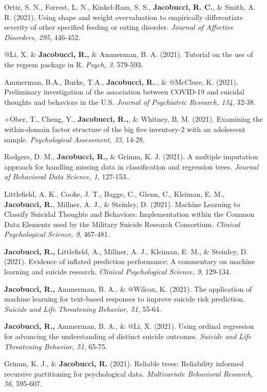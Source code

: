 \documentclass[letterpaper,10pt]{article}
\begin{document}
\begin{etaremune}
	\item Ortiz, S. N., Forrest, L. N., Kinkel-Ram, S. S., \textbf{Jacobucci, R. C.}, \& Smith, A. R. (2021). Using shape and weight overvaluation to empirically differentiate severity of other specified feeding or eating disorder. \emph{Journal of Affective Disorders, 295}, 446-452.
	\item $@$Li, X. \& \textbf{Jacobucci, R.,} \& Ammerman, B. A. (2021). Tutorial on the use of the regsem package in R. \emph{Psych, 3}. 579-593.
		\item Ammerman, B.A., Burke, T.A., \textbf{Jacobucci, R.}., \& $@$McClure, K. (2021). Preliminary investigation of the association between COVID-19 and suicidal thoughts and behaviors in the U.S. \emph{Journal of Psychiatric Research, 134}, 32-38.
	\item $+$Ober, T., Cheng, Y., \textbf{Jacobucci, R.,}, \& Whitney, B, M. (2021). Examining the within-domain factor structure of the big five inventory-2 with an adolescent sample. \emph{Psychological Assessment, 33}, 14-28.
		\item Rodgers, D. M., \textbf{Jacobucci, R.,} \& Grimm, K. J. (2021). A multiple imputation approach for handling missing data in classification and regression trees. \emph{Journal of Behavioral Data Science, 1}, 127-153..
	\item Littlefield, A. K., Cooke, J. T., Bagge, C., Glenn, C., Kleiman, E. M., \textbf{Jacobucci, R.}, Millner, A. J., \& Steinley, D. (2021). Machine Learning to Classify Suicidal Thoughts and Behaviors: Implementation within the Common Data Elements used by the Military Suicide Research Consortium. \emph{Clinical Psychological Science, 9}, 467-481.
	\item \textbf{Jacobucci, R.,} Littlefield, A., Millner, A. J., Kleiman, E. M., \& Steinley, D. (2021). Evidence of inflated prediction performance: A commentary on machine learning and suicide research. \emph{Clinical Psychological Science, 9}, 129-134.
	\item \textbf{Jacobucci, R.,} Ammerman, B. A., \& $@$Wilcox, K. (2021). The application of machine learning for text-based responses to improve suicide risk prediction. \emph{Suicide and Life Threatening Behavior, 51}, 55-64.
	\item \textbf{Jacobucci, R.,} Ammerman, B. A., \& $@$Li, X. (2021). Using ordinal regression for advancing the understanding of distinct suicide outcomes. \emph{Suicide and Life Threatening Behavior, 51}, 65-75.
	\item Grimm, K. J., \& \textbf{Jacobucci, R.} (2021). Reliable trees: Reliability informed recursive partitioning for psychological data. \emph{Multivariate Behavioral Research, 56,} 595-607.

\end{etaremune}
\end{document}
